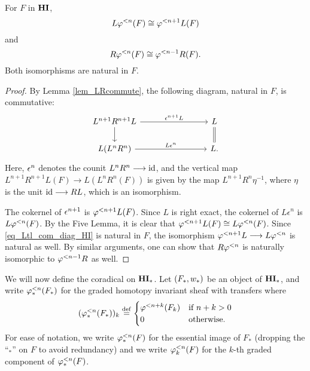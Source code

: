 \begin{prop}\label{prop_tl_L_R}
For $F$ in $\HI$, 
\[
L \tlHI{n}(F) \cong \tlHI{n + 1} L(F)
\]
and
\[
R\tlHI{n}(F) \cong \tlHI{n - 1}R(F).
\] 
Both isomorphisms are natural in $F$.
\end{prop}
\begin{proof}
By Lemma \ref{lem_LRcommute}, the following diagram, natural in $F$, 
is commutative:
\begin{equation}\label{eq_Ltl_com_diag_HI}
\begin{tikzcd}[column sep=80pt]
L^{n + 1}R^{n + 1}L \arrow{r}{\cuHI^{n + 1}L} \arrow{d} &
L \arrow[equals]{d} \\
L(L^{n}R^n) \arrow{r}{L\cuHI^{n}} &
L.
\end{tikzcd}
\end{equation}
Here, $\cuHI^n$ denotes the counit $L^nR^n \to \id$,
and the vertical map $L^{n + 1}R^{n + 1}L(F) \to L(L^nR^n (F))$ is 
given by the map $L^{n + 1}R^n \eta^{-1}$, where $\eta$ is
the unit $\id \to RL$, which is an isomorphism.

The cokernel of $\cuHI^{n + 1}$ is $\tlHI{n + 1}L(F)$. Since $L$ 
is right exact, the cokernel of $L\epsilon^n$ is $L\tlHI{n}(F)$. 
By the Five Lemma, it is clear that $\tlHI{n + 1}L(F) \cong 
L\tlHI{n}(F)$. Since \eqref{eq_Ltl_com_diag_HI} is natural in $F$,
the isomorphism $\tlHI{n + 1}L \to L\tlHI{n}$ is natural as well.
By similar arguments, one can show that $R\tlHI{n}$ is naturally
isomorphic to $\tlHI{n - 1}R$ as well.
\end{proof}

We will now define the coradical on $\HM$. Let $(F_*, \deloop_*)$ 
be an object of $\HM$, and write $\tlHM{n}(F_*)$ for the graded 
homotopy invariant sheaf with transfers where
\[
(\tlHM{n}(F_*))_k \defeq
\begin{cases}
   \tlHI{n + k}(F_k) & \textrm{if } n + k > 0 \\
   0                 & \textrm{otherwise}.
\end{cases}
\]
For ease of notation, we write $\tlHM{n}(F)$ for the essential 
image of $F_*$ (dropping the ``$_*$'' on $F$ to avoid 
redundancy) and we write $\tlHM[k]{n}(F)$ for the $k$-th graded 
component of $\tlHM{n}(F)$.

